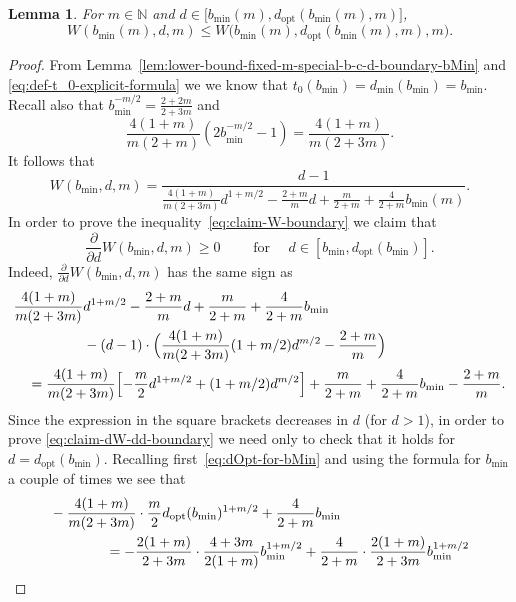 \documentclass[a4paper]{amsart} %
\newtheorem{lemma}[theorem]{Lemma}
\theoremstyle{definition}
\theoremstyle{remark}
\numberwithin{equation}{section}
\newcommand*{\NNone}{\mathbb{N}}
\newcommand*{\XXXspecialbd}{W}
\newcommand*{\bMin}{b_{\min}}
\newcommand*{\dMin}{d_{\min}}
\newcommand*{\dOpt}{d_{\mathrm{opt}}}
\begin{document}
\begin{lemma}
	\label{lem:lower-bound-fixed-m-special-b-c-d-boundary-bMin-part-2}
	For $m\in\NNone$
	and
	$d \in \bigl[\bMin(m), \dOpt(\bMin(m),m)\bigr]$,
	\begin{equation}
	\label{eq:claim-W-boundary}
	\XXXspecialbd(\bMin(m), d, m) \leq \XXXspecialbd\bigl(\bMin(m), \dOpt(\bMin(m),m), m\bigr).
	\end{equation}
\end{lemma}

\begin{proof} 
	From Lemma~\ref{lem:lower-bound-fixed-m-special-b-c-d-boundary-bMin} and \eqref{eq:def-t_0-explicit-formula} we 
	we know that
	$t_0(\bMin) = \dMin(\bMin) = \bMin$. 
	Recall also that
	$\bMin^{-m/2} = \frac{2+2m}{2+3m}$ 
	and
	\[
	\frac{4(1+m)}{m(2+m)}(2\bMin^{-m/2}  -1) = 	\frac{4(1+m)}{m(2+3m)}. 
	\]
	It follows that
	\[
	\XXXspecialbd(\bMin,d,m)= \frac{d-1}{
		\frac{4(1+m)}{m(2+3m)}d^{1+m/2} -\frac{2+m}{m}d + \frac{m}{2+m} + \frac{4}{2+m} \bMin(m)}.
	\]
	In order to prove the inequality~\eqref{eq:claim-W-boundary} 
	we claim that
	\begin{equation}
	\label{eq:claim-dW-dd-boundary}
	\frac{\partial }{\partial d} \XXXspecialbd(\bMin, d , m) \geq 0  \qquad\text{ for } \quad d \in [\bMin, \dOpt(\bMin)].
	\end{equation} 	 
	Indeed, $\frac{\partial }{\partial d} \XXXspecialbd(\bMin, d , m)$
	has the same sign as
	\begin{align*}
	&\frac{4(1+m)}{m(2+3m)}d^{1+m/2} -\frac{2+m}{m}d + \frac{m}{2+m} + \frac{4}{2+m} \bMin\\
	&\qquad \qquad \quad -(d-1)\cdot\Bigl(\frac{4(1+m)}{m(2+3m)}(1+m/2)d^{m/2} -\frac{2+m}{m}\Bigr)
	\\
	&\quad= \frac{4(1+m)}{m(2+3m)}\Bigl[ - \frac{m}{2} d^{1+m/2} 
	+ (1+m/2)d^{m/2} \Bigr]
	+ \frac{m}{2+m} + \frac{4}{2+m} \bMin
	- \frac{2+m}{m}.
	\end{align*}
	Since the expression in the square brackets decreases in $d$ (for $d>1$),
	in order to prove \eqref{eq:claim-dW-dd-boundary} we need only to check that it holds for $d = \dOpt(\bMin)$.
	Recalling first~\eqref{eq:dOpt-for-bMin}
	and using the formula for $\bMin$ a couple of times we see that
	\begin{align*}
	\MoveEqLeft[4]
	-\frac{4(1+m)}{m(2+3m)}\cdot\frac{m}{2}\dOpt(\bMin)^{1+m/2} 
	+ \frac{4}{2+m} \bMin \\
	&=-\frac{2(1+m)}{2+3m}\cdot
	\frac{4+3m}{2(1+m)}\bMin^{1+m/2} 
	+ \frac{4}{2+m} \cdot\frac{2(1+m)}{2+3m}\bMin^{1+m/2}\\

\end{align*}
\end{proof}
\end{document}
